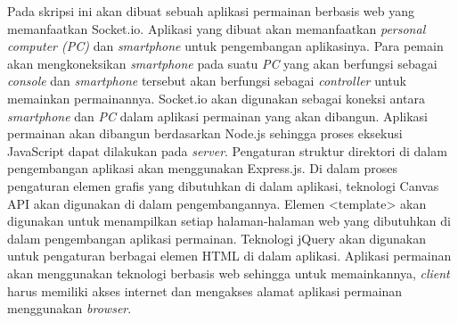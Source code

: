 Pada skripsi ini akan dibuat sebuah aplikasi permainan berbasis web yang memanfaatkan Socket.io. Aplikasi yang dibuat akan memanfaatkan \textit{personal computer (PC)} dan \textit{smartphone} untuk pengembangan aplikasinya. Para pemain akan mengkoneksikan \textit{smartphone} pada suatu \textit{PC} yang akan berfungsi sebagai \textit{console} dan \textit{smartphone} tersebut akan berfungsi sebagai \textit{controller} untuk memainkan permainannya. Socket.io akan digunakan sebagai koneksi antara \textit{smartphone} dan \textit{PC} dalam aplikasi permainan yang akan dibangun. Aplikasi permainan akan dibangun berdasarkan Node.js sehingga proses eksekusi JavaScript dapat dilakukan pada \textit{server}. Pengaturan struktur direktori di dalam pengembangan aplikasi akan menggunakan Express.js. Di dalam proses pengaturan elemen grafis yang dibutuhkan di dalam aplikasi, teknologi Canvas API akan digunakan di dalam pengembangannya. Elemen <template> akan digunakan untuk menampilkan setiap halaman-halaman web yang dibutuhkan di dalam pengembangan aplikasi permainan. Teknologi jQuery akan digunakan untuk pengaturan berbagai elemen HTML di dalam aplikasi. Aplikasi permainan akan menggunakan teknologi berbasis web sehingga untuk memainkannya, \textit{client} harus memiliki akses internet dan mengakses alamat aplikasi permainan menggunakan \textit{browser}.



